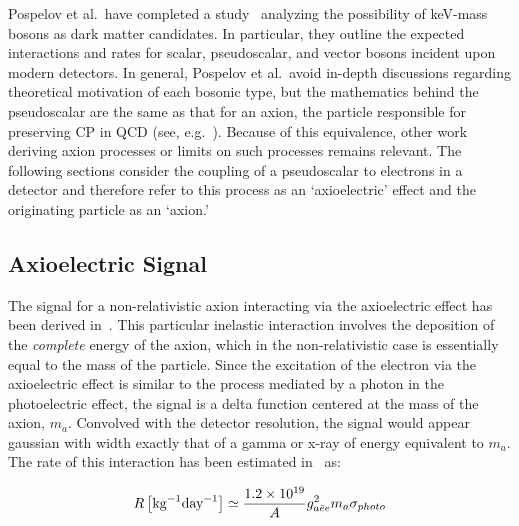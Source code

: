 	Pospelov et al.~have completed a study~\cite{Pospelov:2008jk} analyzing the possibility of keV-mass bosons as dark matter candidates.  In particular, they outline the expected interactions and rates for scalar, pseudoscalar, and vector bosons incident upon modern detectors.  In general, Pospelov et al.~avoid in-depth discussions regarding theoretical motivation of each bosonic type, but the mathematics behind the pseudoscalar are the same as that for an axion, the particle responsible for preserving CP in QCD (see, e.g.~\cite{Amsler20081}).  Because of this equivalence, other work deriving axion processes or limits on such processes remains relevant.  The following sections consider the coupling of a pseudoscalar to electrons in a detector and therefore refer to this process as an `axioelectric' effect and the originating particle as an `axion.'  

	\subsection{Axioelectric Signal}
	\label{sec:CalcLimitsOnHeavyAxionSignal}		

	The signal for a non-relativistic axion interacting via the axioelectric effect has been derived in~\cite{Pospelov:2008jk}.  This particular inelastic interaction involves the deposition of the \emph{complete} energy of the axion, which in the non-relativistic case is essentially equal to the mass of the particle.  Since the excitation of the electron via the axioelectric effect is similar to the process mediated by a photon in the photoelectric effect, the signal is a delta function centered at the mass of the axion, $m_{a}$.  Convolved with the detector resolution, the signal would appear gaussian with width exactly that of a gamma or x-ray of energy equivalent to $m_{a}$.  The rate of this interaction has been estimated in~\cite{Pospelov:2008jk} as:
	
		\begin{equation}
			R \left[ \text{kg}^{-1} \text{day}^{-1} \right]\simeq \frac{1.2\times 10^{19}}{A} g_{a\bar{e}e}^{2} m_a \sigma_{photo}
			\label{eqn:AxioelectricRate}
		\end{equation}

